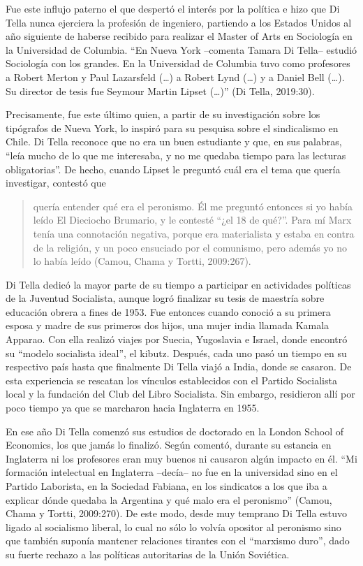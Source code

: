 Fue este influjo paterno el que despertó el interés por la política e hizo que Di Tella nunca ejerciera la profesión de ingeniero, partiendo a los Estados Unidos al año siguiente de haberse recibido para realizar el Master of Arts en Sociología en la Universidad de Columbia. ``En Nueva York --comenta Tamara Di Tella-- estudió Sociología con los grandes. En la Universidad de Columbia tuvo como profesores a Robert Merton y Paul Lazarsfeld (\ldots) a Robert Lynd (\ldots) y a Daniel Bell (\ldots). Su director de tesis fue Seymour Martin Lipset (\ldots)'' (Di Tella, 2019:30).

Precisamente, fue este último quien, a partir de su investigación sobre los tipógrafos de Nueva York, lo inspiró para su pesquisa sobre el sindicalismo en Chile. Di Tella reconoce que no era un buen estudiante y que, en sus palabras, ``leía mucho de lo que me interesaba, y no me quedaba tiempo para las lecturas obligatorias''. De hecho, cuando Lipset le preguntó cuál era el tema que quería investigar, contestó que

\begin{quote}
quería entender qué era el peronismo. Él me preguntó entonces si yo había leído El Dieciocho Brumario, y le contesté ``¿el 18 de qué?''. Para mí Marx tenía una connotación negativa, porque era materialista y estaba en contra de la religión, y un poco ensuciado por el comunismo, pero además yo no lo había leído (Camou, Chama y Tortti, 2009:267).
\end{quote}

Di Tella dedicó la mayor parte de su tiempo a participar en actividades políticas de la Juventud Socialista, aunque logró finalizar su tesis de maestría sobre educación obrera a fines de 1953. Fue entonces cuando conoció a su primera esposa y madre de sus primeros dos hijos, una mujer india llamada Kamala Apparao. Con ella realizó viajes por Suecia, Yugoslavia e Israel, donde encontró su ``modelo socialista ideal'', el kibutz. Después, cada uno pasó un tiempo en su respectivo país hasta que finalmente Di Tella viajó a India, donde se casaron. De esta experiencia se rescatan los vínculos establecidos con el Partido Socialista local y la fundación del Club del Libro Socialista. Sin embargo, residieron allí por poco tiempo ya que se marcharon hacia Inglaterra en 1955.

En ese año Di Tella comenzó sus estudios de doctorado en la London School of Economics, los que jamás lo finalizó. Según comentó, durante su estancia en Inglaterra ni los profesores eran muy buenos ni causaron algún impacto en él. ``Mi formación intelectual en Inglaterra --decía-- no fue en la universidad sino en el Partido Laborista, en la Sociedad Fabiana, en los sindicatos a los que iba a explicar dónde quedaba la Argentina y qué malo era el peronismo'' (Camou, Chama y Tortti, 2009:270). De este modo, desde muy temprano Di Tella estuvo ligado al socialismo liberal, lo cual no sólo lo volvía opositor al peronismo sino que también suponía mantener relaciones tirantes con el ``marxismo duro'', dado su fuerte rechazo a las políticas autoritarias de la Unión Soviética.


